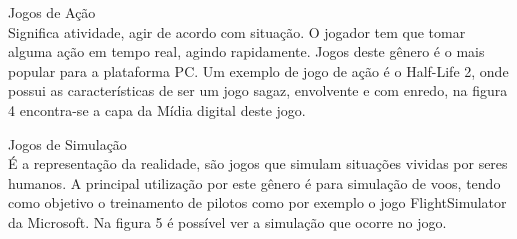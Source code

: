 \begin{alineascomponto}
\item Jogos de Ação\\
Significa atividade, agir de acordo com  situação. O jogador tem que tomar alguma ação em tempo real, agindo rapidamente. Jogos deste gênero é o mais popular para a plataforma PC. Um exemplo de jogo de ação é o Half-Life 2, onde possui as características de ser um jogo sagaz, envolvente e com enredo, na figura 4 encontra-se a capa da Mídia digital deste jogo.
\end{alineascomponto}
\begin{figure}[h!]
		\centering
	\end{figure}
\begin{alineascomponto}
\item Jogos de Simulação\\
É a representação da realidade, são jogos que simulam situações vividas por seres humanos. A principal utilização por este gênero é para simulação de voos, tendo como objetivo o treinamento de pilotos como por exemplo o jogo FlightSimulator da Microsoft. Na figura 5 é possível ver a simulação que ocorre no jogo.
\end{alineascomponto}
\begin{figure}[h!]
		\centering
	\end{figure}

